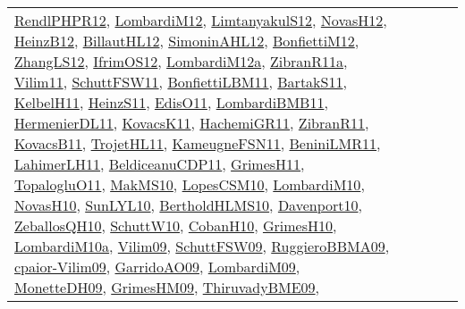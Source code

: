 {\begin{longtable}{lp{3cm}>{\raggedright}p{6cm}>{\raggedright}p{6cm}p{8cm}}
\href{papers/RendlPHPR12.pdf}{RendlPHPR12}\cite{RendlPHPR12}, \href{articles/LombardiM12.pdf}{LombardiM12}\cite{LombardiM12}, \href{articles/LimtanyakulS12.pdf}{LimtanyakulS12}\cite{LimtanyakulS12}, \href{articles/NovasH12.pdf}{NovasH12}\cite{NovasH12}, \href{papers/HeinzB12.pdf}{HeinzB12}\cite{HeinzB12}, \href{papers/BillautHL12.pdf}{BillautHL12}\cite{BillautHL12}, \href{papers/SimoninAHL12.pdf}{SimoninAHL12}\cite{SimoninAHL12}, \href{papers/BonfiettiM12.pdf}{BonfiettiM12}\cite{BonfiettiM12}, \href{papers/ZhangLS12.pdf}{ZhangLS12}\cite{ZhangLS12}, \href{papers/IfrimOS12.pdf}{IfrimOS12}\cite{IfrimOS12}, \href{articles/LombardiM12a.pdf}{LombardiM12a}\cite{LombardiM12a}, \href{papers/ZibranR11a.pdf}{ZibranR11a}\cite{ZibranR11a}, \href{papers/Vilim11.pdf}{Vilim11}\cite{Vilim11}, \href{articles/SchuttFSW11.pdf}{SchuttFSW11}\cite{SchuttFSW11}, \href{papers/BonfiettiLBM11.pdf}{BonfiettiLBM11}\cite{BonfiettiLBM11}, \href{articles/BartakS11.pdf}{BartakS11}\cite{BartakS11}, \href{articles/KelbelH11.pdf}{KelbelH11}\cite{KelbelH11}, \href{papers/HeinzS11.pdf}{HeinzS11}\cite{HeinzS11}, \href{papers/EdisO11.pdf}{EdisO11}\cite{EdisO11}, \href{papers/LombardiBMB11.pdf}{LombardiBMB11}\cite{LombardiBMB11}, \href{papers/HermenierDL11.pdf}{HermenierDL11}\cite{HermenierDL11}, \href{articles/KovacsK11.pdf}{KovacsK11}\cite{KovacsK11}, \href{articles/HachemiGR11.pdf}{HachemiGR11}\cite{HachemiGR11}, \href{papers/ZibranR11.pdf}{ZibranR11}\cite{ZibranR11}, \href{articles/KovacsB11.pdf}{KovacsB11}\cite{KovacsB11}, \href{articles/TrojetHL11.pdf}{TrojetHL11}\cite{TrojetHL11}, \href{papers/KameugneFSN11.pdf}{KameugneFSN11}\cite{KameugneFSN11}, \href{articles/BeniniLMR11.pdf}{BeniniLMR11}\cite{BeniniLMR11}, \href{papers/LahimerLH11.pdf}{LahimerLH11}\cite{LahimerLH11}, \href{articles/BeldiceanuCDP11.pdf}{BeldiceanuCDP11}\cite{BeldiceanuCDP11}, \href{papers/GrimesH11.pdf}{GrimesH11}\cite{GrimesH11}, \href{articles/TopalogluO11.pdf}{TopalogluO11}\cite{TopalogluO11}, \href{papers/MakMS10.pdf}{MakMS10}\cite{MakMS10}, \href{articles/LopesCSM10.pdf}{LopesCSM10}\cite{LopesCSM10}, \href{papers/LombardiM10.pdf}{LombardiM10}\cite{LombardiM10}, \href{articles/NovasH10.pdf}{NovasH10}\cite{NovasH10}, \href{papers/SunLYL10.pdf}{SunLYL10}\cite{SunLYL10}, \href{papers/BertholdHLMS10.pdf}{BertholdHLMS10}\cite{BertholdHLMS10}, \href{papers/Davenport10.pdf}{Davenport10}\cite{Davenport10}, \href{articles/ZeballosQH10.pdf}{ZeballosQH10}\cite{ZeballosQH10}, \href{papers/SchuttW10.pdf}{SchuttW10}\cite{SchuttW10}, \href{papers/CobanH10.pdf}{CobanH10}\cite{CobanH10}, \href{papers/GrimesH10.pdf}{GrimesH10}\cite{GrimesH10}, \href{articles/LombardiM10a.pdf}{LombardiM10a}\cite{LombardiM10a}, \href{papers/Vilim09.pdf}{Vilim09}\cite{Vilim09}, \href{papers/SchuttFSW09.pdf}{SchuttFSW09}\cite{SchuttFSW09}, \href{articles/RuggieroBBMA09.pdf}{RuggieroBBMA09}\cite{RuggieroBBMA09}, \href{papers/cpaior-Vilim09.pdf}{cpaior-Vilim09}\cite{cpaior-Vilim09}, \href{articles/GarridoAO09.pdf}{GarridoAO09}\cite{GarridoAO09}, \href{papers/LombardiM09.pdf}{LombardiM09}\cite{LombardiM09}, \href{papers/MonetteDH09.pdf}{MonetteDH09}\cite{MonetteDH09}, \href{papers/GrimesHM09.pdf}{GrimesHM09}\cite{GrimesHM09}, \href{papers/ThiruvadyBME09.pdf}{ThiruvadyBME09}\cite{ThiruvadyBME09}, 
\end{longtable}}
